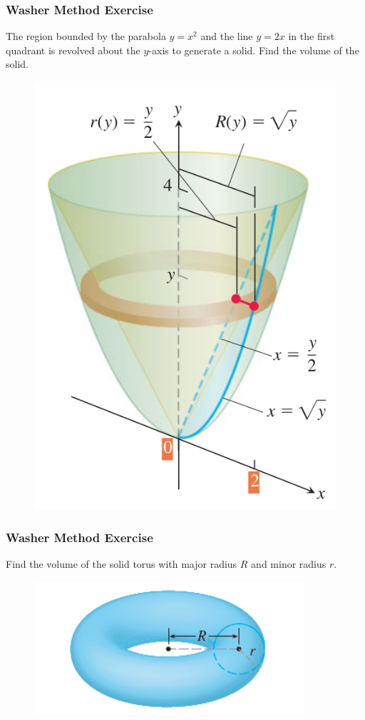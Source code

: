 \documentclass[xcolor=dvipsnames]{beamer}
\begin{document}
\begin{frame}
  \frametitle{Washer Method Exercise}
{\ubung} The region bounded by the parabola $y=x^{2}$ and the line
$y=2x$ in the first quadrant is revolved about the $y$-axis to
generate a solid. Find the volume of the solid.
\begin{figure}[h]
  \includegraphics[scale=0.25]{./diagrams/radii.png}
\end{figure}
\end{frame}

\begin{frame}
  \frametitle{Washer Method Exercise}
  {\ubung} Find the volume of the solid torus with major radius $R$
  and minor radius $r$.
\begin{figure}[h]
  \includegraphics[scale=0.6]{./diagrams/torus.png}
\end{figure}
\end{frame}
\end{document}

